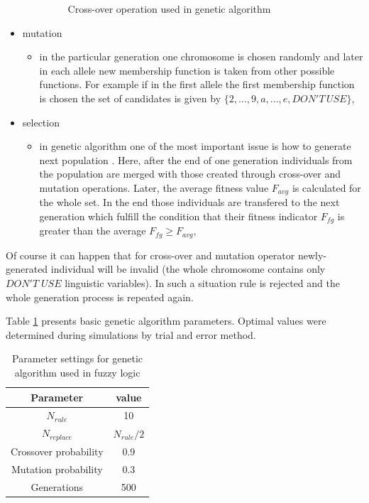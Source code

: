 \begin{itemize}
\begin{itemize}
\begin{figure}[H]
\begin{center}
                    \end{center}
                    \caption{Cross-over operation used in genetic algorithm}
                    \label{fig:cross_over}
                \end{figure}
        \end{itemize}
    \item mutation
        \begin{itemize}
            \item in the particular generation one chromosome is chosen
                randomly and later in each allele new membership function is
                taken from other possible functions. For example if in the first
                allele the first membership function is chosen the set of
                candidates is given by $\{2, \ldots, 9, a, \ldots, e, DON'T\,
                USE\}$,
        \end{itemize}
    \item selection
        \begin{itemize}
            \item in genetic algorithm one of the most important issue is how
                to generate next population \cite{bib22}. Here, after the end of one
                generation individuals from the population are merged with
                those created through cross-over and mutation operations.
                Later, the average fitness value $F_{avg}$ is calculated for the whole
                set. In the end those individuals are transfered to the next
                generation which fulfill the condition that their fitness indicator $F_{fg}$ 
                is greater than the average $F_{fg} \ge F_{avg}$,
        \end{itemize}
\end{itemize}
Of course it can happen that for cross-over and mutation operator
newly-generated individual will be invalid (the whole chromosome contains only
$DON'T\; USE$ linguistic variables). In such a situation rule is rejected and
the whole generation process is repeated again.

Table \ref{tab:fuzzy_genetic_parameters} presents basic genetic algorithm parameters.
Optimal values were determined during simulations by trial and error method.
\begin{table}[H]
    \caption{Parameter settings for genetic algorithm used in fuzzy logic}
    \centering
    \begin{tabular}{|c|c|}
        \hline
        Parameter & value \\ \hline \hline
        $N_{rule}$ & 10 \\ \hline
        $N_{replace}$ & $N_{rule}/2$ \\ \hline
        Crossover probability & 0.9 \\ \hline
        Mutation probability & 0.3 \\ \hline
        Generations & 500 \\ \hline
    \end{tabular}
    \label{tab:fuzzy_genetic_parameters}
\end{table}

